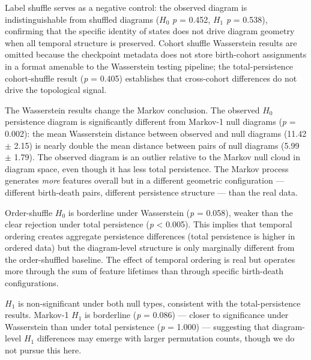 Label shuffle serves as a negative control: the observed diagram is indistinguishable from shuffled diagrams ($H_0$ \textit{p} = 0.452, $H_1$ \textit{p} = 0.538), confirming that the specific identity of states does not drive diagram geometry when all temporal structure is preserved. Cohort shuffle Wasserstein results are omitted because the checkpoint metadata does not store birth-cohort assignments in a format amenable to the Wasserstein testing pipeline; the total-persistence cohort-shuffle result (\textit{p} = 0.405) establishes that cross-cohort differences do not drive the topological signal.

The Wasserstein results change the Markov conclusion. The observed $H_0$ persistence diagram is significantly different from Markov-1 null diagrams (\textit{p} = 0.002): the mean Wasserstein distance between observed and null diagrams (11.42 $\pm$ 2.15) is nearly double the mean distance between pairs of null diagrams (5.99 $\pm$ 1.79). The observed diagram is an outlier relative to the Markov null cloud in diagram space, even though it has less total persistence. The Markov process generates \textit{more} features overall but in a different geometric configuration --- different birth-death pairs, different persistence structure --- than the real data.

Order-shuffle $H_0$ is borderline under Wasserstein (\textit{p} = 0.058), weaker than the clear rejection under total persistence (\textit{p} < 0.005). This implies that temporal ordering creates aggregate persistence differences (total persistence is higher in ordered data) but the diagram-level structure is only marginally different from the order-shuffled baseline. The effect of temporal ordering is real but operates more through the sum of feature lifetimes than through specific birth-death configurations.

$H_1$ is non-significant under both null types, consistent with the total-persistence results. Markov-1 $H_1$ is borderline (\textit{p} = 0.086) --- closer to significance under Wasserstein than under total persistence (\textit{p} = 1.000) --- suggesting that diagram-level $H_1$ differences may emerge with larger permutation counts, though we do not pursue this here.

